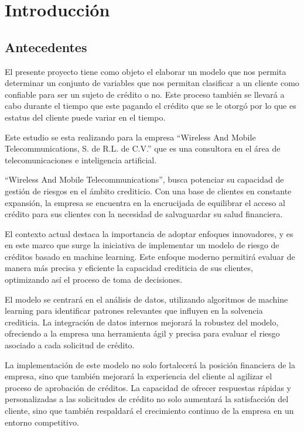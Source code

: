 \chapter{Introducción}\label{cap1:Introducción}

\section{Antecedentes}



El presente proyecto tiene como objeto el elaborar un modelo que nos permita determinar un 
conjunto de variables que nos permitan clasificar a un cliente como confiable para ser un 
sujeto de crédito o no. Este proceso también se llevará a cabo durante el tiempo que este 
pagando el crédito que se le otorgó por lo que es estatus del cliente puede variar en el 
tiempo. \medskip

Este estudio se esta realizando para la empresa  “Wireless And Mobile Telecommunications, S. de R.L. de C.V.” 
que  es una consultora en el área de telecomunicaciones e inteligencia artificial. \medskip

“Wireless And Mobile Telecommunications”, busca potenciar su capacidad de gestión de riesgos 
en el ámbito crediticio. Con una base de clientes en constante expansión, la empresa se 
encuentra en la encrucijada de equilibrar el acceso al crédito para sus clientes con la 
necesidad de salvaguardar su salud financiera. \medskip

El contexto actual destaca la importancia de adoptar enfoques innovadores, y es en este marco 
que surge la iniciativa de implementar un modelo de riesgo de créditos basado en 
machine learning. Este enfoque moderno permitirá evaluar de manera más precisa y 
eficiente la capacidad crediticia de sus clientes, optimizando así el proceso de toma de 
decisiones. \medskip

El modelo se centrará en el análisis de datos, utilizando algoritmos de machine learning para 
identificar patrones relevantes que influyen en la solvencia crediticia. La integración de datos 
internos mejorará la robustez del modelo, ofreciendo a la empresa una herramienta ágil y 
precisa para evaluar el riesgo asociado a cada solicitud de crédito. \medskip

La implementación de este modelo no solo fortalecerá la posición financiera de la empresa, 
sino que también mejorará la experiencia del cliente al agilizar el proceso de aprobación de 
créditos. La capacidad de ofrecer respuestas rápidas y personalizadas a las solicitudes de 
crédito no solo aumentará la satisfacción del cliente, sino que también respaldará el 
crecimiento continuo de la empresa en un entorno competitivo.
